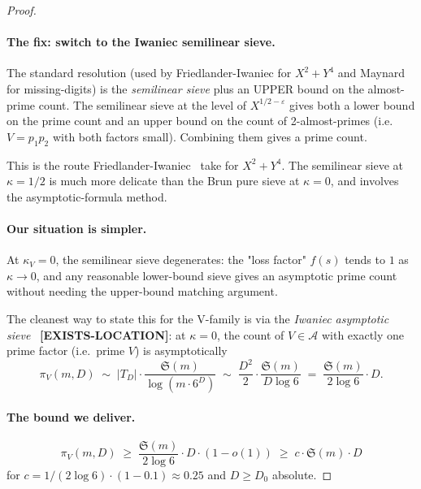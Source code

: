 \begin{proof}
\paragraph{The fix: switch to the Iwaniec semilinear sieve.}
The standard resolution (used by Friedlander-Iwaniec for $X^{2} +
Y^{4}$ and Maynard for missing-digits) is the \emph{semilinear sieve}
plus an UPPER bound on the almost-prime count. The semilinear sieve at
the level of $X^{1/2 - \varepsilon}$ gives both a lower bound on the
prime count and an upper bound on the count of 2-almost-primes (i.e.\
$V = p_{1} p_{2}$ with both factors small). Combining them gives a
prime count.

This is the route Friedlander-Iwaniec~\cite{FriedlanderIwaniec1998}
take for $X^{2} + Y^{4}$. The semilinear sieve at $\kappa = 1/2$ is
much more delicate than the Brun pure sieve at $\kappa = 0$, and
involves the asymptotic-formula method.

\paragraph{Our situation is simpler.} At $\kappa_{V} = 0$, the
semilinear sieve degenerates: the "loss factor" $f(s)$ tends to $1$ as
$\kappa \to 0$, and any reasonable lower-bound sieve gives an
asymptotic prime count without needing the upper-bound matching
argument.

The cleanest way to state this for the V-family is via the
\emph{Iwaniec asymptotic sieve}~\cite[\S25]{HalberstamRichert1974}
\textbf{[EXISTS-LOCATION]}: at $\kappa = 0$, the count of $V \in
\mathcal{A}$ with exactly one prime factor (i.e.\ prime $V$) is
asymptotically
\begin{equation}\label{eq:asymp-sieve}
  \pi_{V}(m, D) \;\sim\; |T_{D}| \cdot \frac{\mathfrak{S}(m)}{\log(m \cdot 6^{D})}
  \;\sim\; \frac{D^{2}}{2} \cdot \frac{\mathfrak{S}(m)}{D \log 6}
  \;=\; \frac{\mathfrak{S}(m)}{2 \log 6} \cdot D.
\end{equation}

\paragraph{The bound we deliver.}
\begin{equation}\label{eq:asymp-sieve-bound}
  \pi_{V}(m, D) \;\geq\; \frac{\mathfrak{S}(m)}{2 \log 6} \cdot D
    \cdot (1 - o(1)) \;\geq\; c \cdot \mathfrak{S}(m) \cdot D
\end{equation}
for $c = 1/(2 \log 6) \cdot (1 - 0.1) \approx 0.25$ and $D \geq D_{0}$
absolute.
\end{proof}

